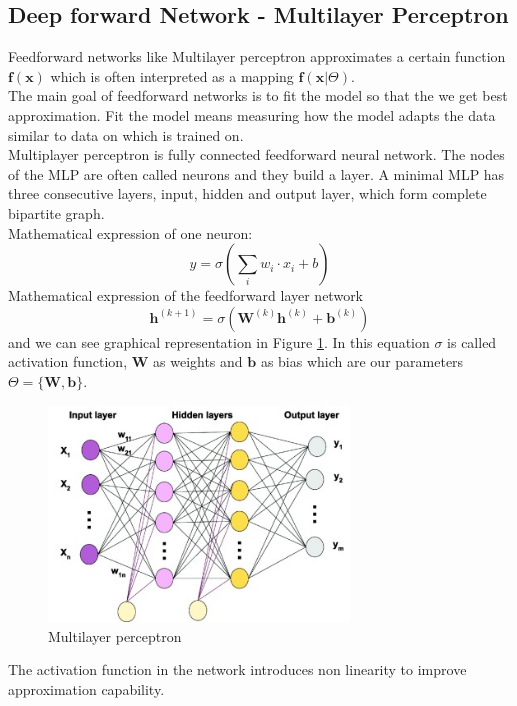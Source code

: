 \subsection{Deep forward Network - Multilayer Perceptron }
Feedforward networks like Multilayer perceptron approximates a certain function $\mathbf{f(\mathbf{x})}$ which is often interpreted as a mapping $\mathbf{f}(\mathbf{x}|\Theta)$.\\
The main goal of feedforward networks is to fit the model so that the we get best approximation. Fit the model means measuring how the model adapts the data similar to data on which is trained on.\\
Multiplayer perceptron is fully connected feedforward neural network. The nodes of the MLP are often called neurons and they build a layer. A minimal MLP has three consecutive layers, input, hidden and output layer, which form complete bipartite graph.\\
Mathematical expression of one neuron:
\begin{equation}
	y = \sigma(\sum_i{w_i \cdot x_i} + b) 
\end{equation}
Mathematical expression of the feedforward layer network
\begin{equation}
	\mathbf{h}^{(k+1)} =\sigma\left(\mathbf{W}^{(k)}\mathbf{h}^{(k)} + \mathbf{b}^{(k)}\right)
\end{equation} and we can see graphical representation in Figure  \ref{mlp}.
In this equation $\sigma$ is called activation function, 
$\mathbf{W}$ as weights and $\mathbf{b}$ as bias which are our parameters $\Theta =\{\mathbf{W},\mathbf{b}\}$.\\
\begin{figure}[h!]
	\centering\includegraphics[width=8cm]{chapters/chapter2/mlp}
	\caption{Multilayer perceptron\cite{mlppic}}
	\label{mlp}
\end{figure}
The activation function in the network introduces non linearity to improve approximation capability.\\
